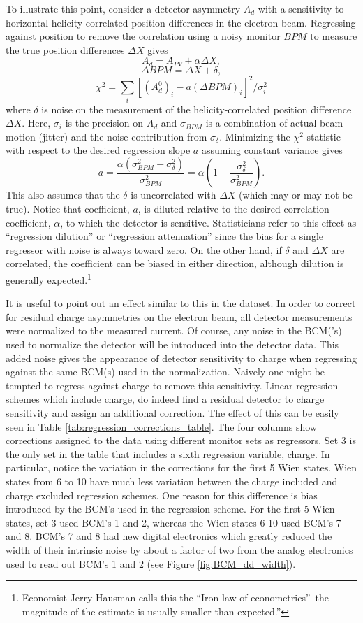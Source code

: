 To illustrate this point, consider a detector asymmetry $A_d$ with a sensitivity to horizontal helicity-correlated position differences in the electron beam. Regressing against position to remove the correlation using a noisy monitor $BPM$ to measure the true position differences $\Delta X$ gives 
\[
A_d=A_{PV}+\alpha\Delta X,
\]
\[
\Delta BPM = \Delta X + \delta,
\]
\[
\chi^2=\sum_{i}\left[(A_{d}^0)_i-a(\Delta BPM)_i\right]^2/\sigma_i^2
\]  
where $\delta$ is noise on the measurement of the helicity-correlated position difference $\Delta X$. Here, $\sigma_i$ is the precision on $A_d$ and $\sigma_{BPM}$ is a combination of actual beam motion (jitter) and the noise contribution from $\sigma_{\delta}$. Minimizing the $\chi^2$ statistic with respect to the desired regression slope $a$ assuming constant variance gives 
\[
a=\frac{\alpha(\sigma_{BPM}^2-\sigma_{\delta}^2)}{\sigma_{BPM}^2}=\alpha\left(1-\frac{\sigma_{\delta}^2}{\sigma_{BPM}^2}\right).
\]
This also assumes that the $\delta$ is uncorrelated with $\Delta X$ (which may or may not be true). Notice that coefficient, $a$, is diluted relative to the desired correlation coefficient, $\alpha$, to which the detector is sensitive. Statisticians refer to this effect as ``regression dilution'' or ``regression attenuation'' since the bias for a single regressor with noise is always toward zero. On the other hand, if $\delta$ and $\Delta X$ are correlated, the coefficient can be biased in either direction, although dilution is generally expected.\footnote{Economist Jerry Hausman calls this the ``Iron law of econometrics''--the magnitude of the estimate is usually smaller than expected.''\cite{Hausman}}

It is useful to point out an effect similar to this in the \Qs dataset. In order to correct for residual charge asymmetries on the electron beam, all detector measurements were normalized to the measured current. Of course, any noise in the BCM('s) used to normalize the detector will be introduced into the detector data. This added noise gives the appearance of detector sensitivity to charge when regressing against the same BCM(s) used in the normalization. Naively one might be tempted to regress against charge to remove this sensitivity. Linear regression schemes which include charge, do indeed find a residual detector to charge sensitivity and assign an additional correction. The effect of this can be easily seen in Table \ref{tab:regression_corrections_table}. The four columns show corrections assigned to the data using different monitor sets as regressors. Set 3 is the only set in the table that includes a sixth regression variable, charge. In particular, notice the variation in the corrections for the first 5 Wien states. Wien states from 6 to 10 have much less variation between the charge included and charge excluded regression schemes. One reason for this difference is bias introduced by the BCM's used in the regression scheme. For the first 5 Wien states, set 3 used BCM's 1 and 2, whereas the Wien states 6-10 used BCM's 7 and 8. BCM's 7 and 8 had new digital electronics which greatly reduced the width of their intrinsic noise by about a factor of two from the analog electronics used to read out BCM's 1 and 2 (see Figure \ref{fig:BCM_dd_width}). 


